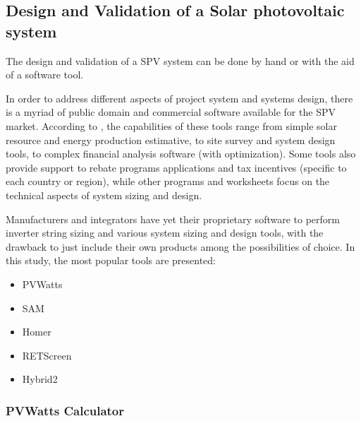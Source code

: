 \subsection{Design and Validation of a Solar photovoltaic system}

The design and validation of a SPV system can be done by hand or with the aid of a software tool. 

In order to address different aspects of project system and systems design, there is a myriad of public domain and commercial software available for the SPV market. According to \cite{Brooks}, the capabilities of these tools range from simple solar resource and energy production estimative, to site survey and system design tools, to complex financial analysis software (with optimization). Some tools also provide support to rebate programs applications and tax incentives (specific to each country or region), while other programs and worksheets focus on the technical aspects of system sizing and design.
 
Manufacturers and integrators have yet their proprietary software to perform inverter string sizing and various system sizing and design tools, with the drawback to just include their own products among the possibilities of choice. 
In this study, the most popular tools are presented: 

\begin{itemize}
\item PVWatts 
\item SAM
\item Homer
\item RETScreen
\item Hybrid2
\end{itemize}

\subsubsection{PVWatts Calculator}

